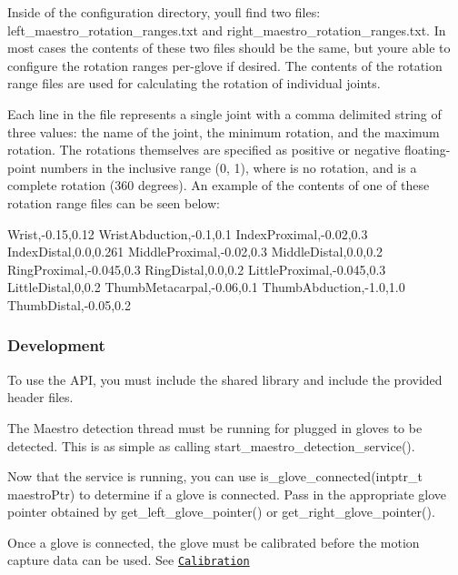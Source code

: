 Inside of the configuration directory, you\textquotesingle{}ll find two files\+: {\ttfamily left\+\_\+maestro\+\_\+rotation\+\_\+ranges.\+txt} and {\ttfamily right\+\_\+maestro\+\_\+rotation\+\_\+ranges.\+txt}. In most cases the contents of these two files should be the same, but you\textquotesingle{}re able to configure the rotation ranges per-\/glove if desired. The contents of the rotation range files are used for calculating the rotation of individual joints.

Each line in the file represents a single joint with a comma delimited string of three values\+: the name of the joint, the minimum rotation, and the maximum rotation. The rotations themselves are specified as positive or negative floating-\/point numbers in the inclusive range {\ttfamily (0, 1)}, where {} is no rotation, and {} is a complete rotation (360 degrees). An example of the contents of one of these rotation range files can be seen below\+: \begin{DoxyVerb}Wrist,-0.15,0.12
WristAbduction,-0.1,0.1
IndexProximal,-0.02,0.3
IndexDistal,0.0,0.261
MiddleProximal,-0.02,0.3
MiddleDistal,0.0,0.2
RingProximal,-0.045,0.3
RingDistal,0.0,0.2
LittleProximal,-0.045,0.3
LittleDistal,0,0.2
ThumbMetacarpal,-0.06,0.1
ThumbAbduction,-1.0,1.0
ThumbDistal,-0.05,0.2
\end{DoxyVerb}


\subsubsection*{Development}

To use the A\+PI, you must include the shared library and include the provided header files.


\begin{DoxyEnumerate}
\item The Maestro detection thread must be running for plugged in gloves to be detected. This is as simple as calling {\ttfamily start\+\_\+maestro\+\_\+detection\+\_\+service()}.
\item Now that the service is running, you can use {\ttfamily is\+\_\+glove\+\_\+connected(intptr\+\_\+t maestro\+Ptr)} to determine if a glove is connected. Pass in the appropriate glove pointer obtained by {\ttfamily get\+\_\+left\+\_\+glove\+\_\+pointer()} or {\ttfamily get\+\_\+right\+\_\+glove\+\_\+pointer()}.
\item Once a glove is connected, the glove must be calibrated before the motion capture data can be used. See \href{#calibrationHeader}{\tt Calibration}
\end{DoxyEnumerate}

